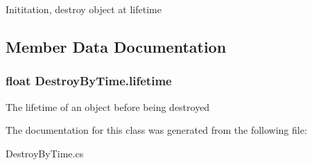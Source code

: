 Inititation, destroy object at lifetime 



\subsection{Member Data Documentation}
\hypertarget{classDestroyByTime_a1c11e0a64a46ee1b3eb9e71c1bc5f8c8}{
\subsubsection[{lifetime}]{\setlength{\rightskip}{0pt plus 5cm}float Destroy\-By\-Time.\-lifetime}}\label{classDestroyByTime_a1c11e0a64a46ee1b3eb9e71c1bc5f8c8}


The lifetime of an object before being destroyed 



The documentation for this class was generated from the following file\-:\begin{DoxyCompactItemize}
\item 
Destroy\-By\-Time.\-cs\end{DoxyCompactItemize}
